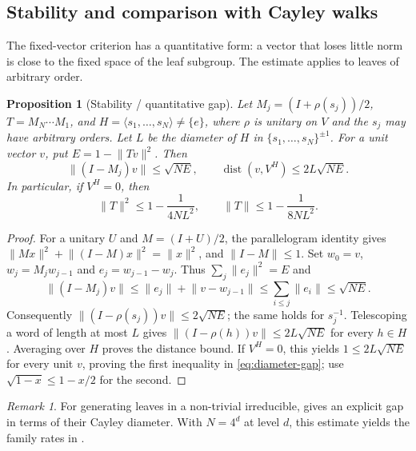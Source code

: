 \documentclass[11pt]{amsart}
\newtheorem{proposition}[proposition]{Proposition}
\theoremstyle{definition}
\theoremstyle{remark}
\newtheorem{remark}[remark]{Remark}
\theoremstyle{plain}
\theoremstyle{plain}
\numberwithin{equation}{section}
\newcommand{\norm}[1]{\lVert #1 \rVert}
\newcommand{\opn}[1]{\norm{#1}}
\begin{document}
\subsection{Stability and comparison with Cayley walks}

The fixed-vector criterion has a quantitative form: a vector that loses
little norm is close to the fixed space of the leaf subgroup. The estimate
applies to leaves of arbitrary order.

\begin{proposition}[Stability / quantitative gap]
\label{prop:stability}
Let $M_j=(I+\rho(s_j))/2$, $T=M_N\cdots M_1$, and
$H=\langle s_1,\ldots,s_N\rangle\ne\{e\}$, where $\rho$ is unitary on $V$ and
the $s_j$ may have arbitrary orders. Let $L$ be the diameter of $H$ in
$\{s_1,\ldots,s_N\}^{\pm1}$. For a unit vector $v$, put
$E=1-\norm{Tv}^2$. Then
\[
 \norm{(I-M_j)v}\le\sqrt{NE},\qquad
 \operatorname{dist}(v,V^H)\le2L\sqrt{NE}.
\]
In particular, if $V^H=0$, then
\begin{equation}\label{eq:diameter-gap}
 \opn T^2\le1-\frac1{4NL^2},\qquad
 \opn T\le1-\frac1{8NL^2}.
\end{equation}
\end{proposition}
\begin{proof}
For a unitary $U$ and $M=(I+U)/2$, the parallelogram identity gives
$\norm{Mx}^2+\norm{(I-M)x}^2=\norm x^2$, and $\opn{I-M}\le1$.
Set $w_0=v$, $w_j=M_jw_{j-1}$ and $e_j=w_{j-1}-w_j$. Thus
$\sum_j\norm{e_j}^2=E$ and
\[
 \norm{(I-M_j)v}\le\norm{e_j}+\norm{v-w_{j-1}}
 \le\sum_{i\le j}\norm{e_i}\le\sqrt{NE}.
\]
Consequently $\norm{(I-\rho(s_j))v}\le2\sqrt{NE}$; the same holds
for $s_j^{-1}$. Telescoping a word of length at most $L$ gives
$\norm{(I-\rho(h))v}\le2L\sqrt{NE}$ for every $h\in H$.
Averaging over $H$ proves the distance bound. If $V^H=0$, this yields
$1\le2L\sqrt{NE}$ for every unit $v$, proving the first inequality in
\eqref{eq:diameter-gap}; use $\sqrt{1-x}\le1-x/2$ for the second.
\end{proof}

\begin{remark}
For generating leaves in a non-trivial irreducible, 
gives an explicit gap in terms of their Cayley diameter. With $N=4^d$
at level $d$, this estimate yields the family rates in
.
\end{remark}



\newpage

\end{document}
